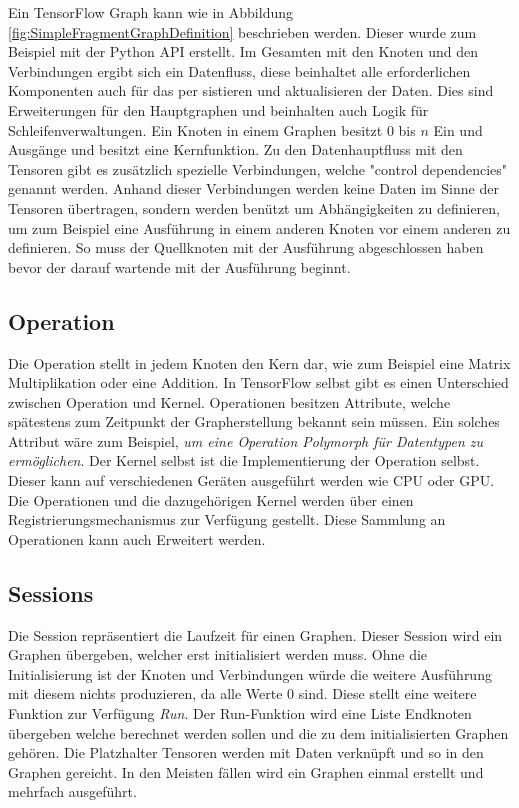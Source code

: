 Ein TensorFlow Graph kann wie in Abbildung \ref{fig:SimpleFragmentGraphDefinition} beschrieben werden.
Dieser wurde zum Beispiel mit der Python API erstellt.
Im Gesamten mit den Knoten und den Verbindungen ergibt sich ein Datenfluss, diese beinhaltet alle erforderlichen Komponenten auch für das per sistieren und aktualisieren der Daten.
Dies sind Erweiterungen für den Hauptgraphen und beinhalten auch Logik für Schleifenverwaltungen.
Ein Knoten in einem Graphen besitzt $0$ bis $n$ Ein und Ausgänge und besitzt eine Kernfunktion. 
Zu den Datenhauptfluss mit den Tensoren gibt es zusätzlich spezielle Verbindungen, welche "control dependencies" genannt werden. 
Anhand dieser Verbindungen werden keine Daten im Sinne der Tensoren übertragen, sondern werden benützt um Abhängigkeiten zu definieren, um zum Beispiel eine Ausführung in einem anderen Knoten vor einem anderen zu definieren.
So muss der Quellknoten mit der Ausführung abgeschlossen haben bevor der darauf wartende mit der Ausführung beginnt. \cite{wp2015tensorflow}

\subsection{Operation}

Die Operation stellt in jedem Knoten den Kern dar, wie zum Beispiel eine Matrix Multiplikation oder eine Addition.
In TensorFlow selbst gibt es einen Unterschied zwischen Operation und Kernel.
Operationen besitzen Attribute, welche spätestens zum Zeitpunkt der Grapherstellung bekannt sein müssen. 
Ein solches Attribut wäre zum Beispiel, \textit{um eine Operation Polymorph für Datentypen zu ermöglichen}. 
Der Kernel selbst ist die Implementierung der Operation selbst. 
Dieser kann auf verschiedenen Geräten ausgeführt werden wie CPU oder GPU.
Die Operationen und die dazugehörigen Kernel werden über einen Registrierungsmechanismus zur Verfügung gestellt. 
Diese Sammlung an Operationen kann auch Erweitert werden. \cite{wp2015tensorflow} 

\subsection{Sessions}

Die Session repräsentiert die Laufzeit für einen Graphen. 
Dieser Session wird ein Graphen übergeben, welcher erst initialisiert werden muss. 
Ohne die Initialisierung ist der Knoten und Verbindungen würde die weitere Ausführung mit diesem nichts produzieren, da alle Werte $0$ sind. 
Diese stellt eine weitere Funktion zur Verfügung \textit{Run}. 
Der Run-Funktion wird eine Liste Endknoten übergeben welche berechnet werden sollen und die zu dem initialisierten Graphen gehören. 
Die Platzhalter Tensoren werden mit Daten verknüpft und so in den Graphen gereicht. 
In den Meisten fällen wird ein Graphen einmal erstellt und mehrfach ausgeführt. \cite{wp2015tensorflow} 

